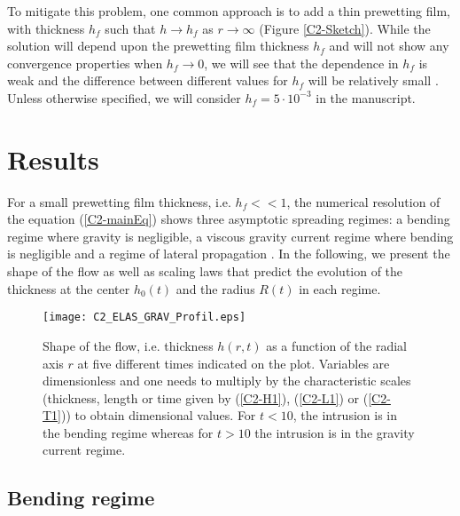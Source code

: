 To  mitigate this  problem,  one  common approach  is  to  add a  thin
prewetting film, with thickness $h_f$  such that $h\rightarrow h_f$ as
$r\rightarrow  \infty$ (Figure  \ref{C2-Sketch}).  While  the solution
will depend upon the prewetting film thickness $h_f$ and will not show
any convergence properties  when $h_f\rightarrow 0$, we  will see that
the dependence in  $h_f$ is weak and the  difference between different
values      for      $h_f$      will     be      relatively      small
\citep{Lister:2013ia,Anonymous:QWXp_4JV}.  Unless otherwise specified,
we will consider $h_f = 5\cdot 10^{-3}$ in the manuscript.



\section{Results}
\label{C2-sec:regime-propagations}

For a small  prewetting film thickness, i.e.   $h_f<<1$, the numerical
resolution of  the equation  (\ref{C2-mainEq}) shows  three asymptotic
spreading regimes:  a bending  regime where  gravity is  negligible, a
viscous  gravity current  regime  where bending  is  negligible and  a
regime               of              lateral               propagation
\citep{Michaut:2011kg,Bunger:2011cb,Lister:2013ia}. In  the following,
we present the shape of the flow  as well as scaling laws that predict
the evolution of  the thickness at the center $h_0(t)$  and the radius
$R(t)$ in each regime.

\begin{figure}[h!]
  \begin{center}
    \graphicspath{ {/Users/thorey/Documents/These/Manuscript/Figure/Chapter2/} }
    \texttt{[image: C2\_ELAS\_GRAV\_Profil.eps]}
    \caption{Shape of the flow, i.e.  thickness $h(r,t)$ as a function
      of the radial axis $r$ at  five different times indicated on the
      plot. Variables are  dimensionless and one needs  to multiply by
      the characteristic  scales (thickness,  length or time  given by
      (\ref{C2-H1}),   (\ref{C2-L1})  or   (\ref{C2-T1}))  to   obtain
      dimensional values.  For $t<10$, the intrusion is in the bending
      regime  whereas  for $t>10$  the  intrusion  is in  the  gravity
      current regime.}
    \label{C2_ELAS_GRAV_Profil}
  \end{center}
\end{figure}

\subsection{Bending regime}
\label{C2-sec:bending-regime}

